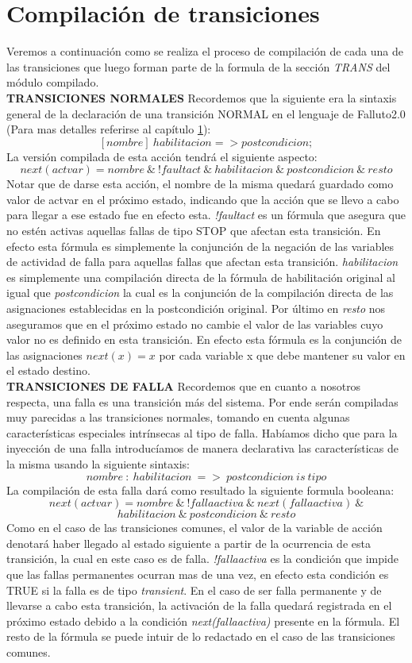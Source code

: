\documentclass[titlepage, 12pt]{book}
\begin{document}
\section{Compilación de transiciones}
Veremos a continuación como se realiza el proceso de compilación de cada una de las transiciones que luego forman parte de la formula de la sección \textit{TRANS} del módulo compilado.\\

\textbf{TRANSICIONES NORMALES}
Recordemos que la siguiente era la sintaxis general de la declaración de una transición NORMAL en el lenguaje de Falluto2.0 (Para mas detalles referirse al capítulo \ref{}):
$$[nombre]~habilitacion => postcondicion;$$
La versión compilada de esta acción tendrá el siguiente aspecto:
$$next(actvar)=nombre~\&~!faultact~\&~habilitacion~\&~postcondicion~\&~resto$$
Notar que de darse esta acción, el nombre de la misma quedará guardado como valor de actvar en el próximo estado, indicando que la acción que se llevo a cabo para llegar a ese estado fue en efecto esta. \textit{!faultact} es un fórmula que asegura que no estén activas aquellas fallas de tipo STOP que afectan esta transición. En efecto esta fórmula es simplemente la conjunción de la negación de las variables de actividad de falla para aquellas fallas que afectan esta transición. \textit{habilitacion} es simplemente una compilación directa de la fórmula de habilitación original al igual que \textit{postcondicion} la cual es la conjunción de la compilación directa de las asignaciones establecidas en la postcondición original. Por último en \textit{resto} nos aseguramos que en el próximo estado no cambie el valor de las variables cuyo valor no es definido en esta transición. En efecto esta fórmula es la conjunción de las asignaciones $next(x)=x$ por cada variable x que debe mantener su valor en el estado destino.\\

\textbf{TRANSICIONES DE FALLA}
Recordemos que en cuanto a nosotros respecta, una falla es una transición más del sistema. Por ende serán compiladas muy parecidas a las transiciones normales, tomando en cuenta algunas características especiales intrínsecas al tipo de falla. Habíamos dicho que para la inyección de una falla introducíamos de manera declarativa las características de la misma usando la siguiente sintaxis:
$$nombre~:~habilitacion~=>~postcondicion~is~tipo$$
La compilación de esta falla dará como resultado la siguiente formula booleana:
$$next(actvar)=nombre~\&~!fallaactiva~\&~next(fallaactiva)~\&$$ $$habilitacion~\&~postcondicion~\&~resto$$
Como en el caso de las transiciones comunes, el valor de la variable de acción denotará haber llegado al estado siguiente a partir de la ocurrencia de esta transición, la cual en este caso es de falla. \textit{!fallaactiva} es la condición que impide que las fallas permanentes ocurran mas de una vez, en efecto esta condición es TRUE si la falla es de tipo \textit{transient}. En el caso de ser falla permanente y de llevarse a cabo esta transición, la activación de la falla quedará registrada en el próximo estado debido a la condición \textit{next(fallaactiva)} presente en la fórmula. El resto de la fórmula se puede intuir de lo redactado en el caso de las transiciones comunes.\\
\end{document}
